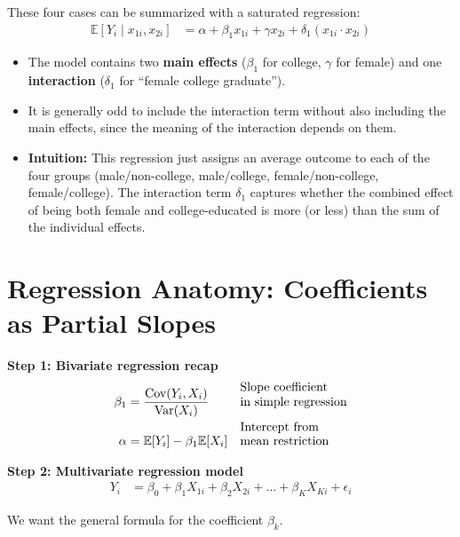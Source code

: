 \documentclass[12pt]{article}
\begin{document}
\noindent These four cases can be summarized with a saturated regression:
\begin{align}
\mathbb{E}[Y_i \mid x_{1i},x_{2i}] 
    &= \alpha + \beta_1 x_{1i} + \gamma x_{2i} + \delta_1(x_{1i} \cdot x_{2i}) 
\end{align}

\begin{itemize}
    \item The model contains two \textbf{main effects} ($\beta_1$ for college, $\gamma$ for female) and one \textbf{interaction} ($\delta_1$ for “female college graduate”).  
    \item It is generally odd to include the interaction term without also including the main effects, since the meaning of the interaction depends on them.  
    \item \textbf{Intuition:} This regression just assigns an average outcome to each of the four groups (male/non-college, male/college, female/non-college, female/college). The interaction term $\delta_1$ captures whether the combined effect of being both female and college-educated is more (or less) than the sum of the individual effects.
\end{itemize}

\section*{\noindent\textbf{Regression Anatomy: Coefficients as Partial Slopes}}

\singlespacing
\noindent \textbf{Step 1: Bivariate regression recap}  
\begin{align}
\beta_1 &= \frac{\text{Cov}(Y_i, X_i)}{\text{Var}(X_i)} && \text{\shortstack[l]{Slope coefficient \\ in simple regression}} \\
\alpha  &= \mathbb{E}[Y_i] - \beta_1 \mathbb{E}[X_i] && \text{\shortstack[l]{Intercept from \\ mean restriction}}
\end{align}

\vspace{1em}
\noindent \textbf{Step 2: Multivariate regression model}  
\begin{align}
Y_i &= \beta_0 + \beta_1 X_{1i} + \beta_2 X_{2i} + \dots + \beta_K X_{Ki} + \epsilon_i 
\end{align}

\noindent We want the general formula for the coefficient $\beta_k$.
\end{document}
